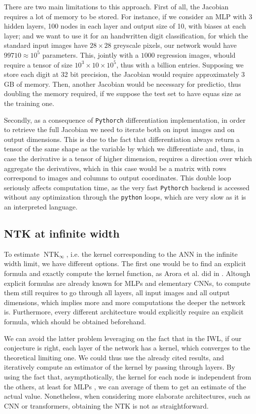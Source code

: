 \documentclass[11pt,notitlepage]{article}
\numberwithin{equation}{section}
\DeclareMathOperator{\NTK}{NTK}
\theoremstyle{remark}
\theoremstyle{definition}
\begin{document}
	There are two main limitations to this approach.
	First of all, the Jacobian requires a lot of memory to be stored.
	For instance, if we consider an MLP with 3 hidden layers, 100 nodes in each layer and output size of 10, with biases at each layer; and we want to use it for an handwritten digit classification, for which the standard input images have $28 \times 28$ greyscale pixels, our network would have $99710 \approx 10^5$ parameters.
	This, jointly with a $1000$ regression images, whould require a tensor of size $10^3 \times 10 \times 10^5$, thus with a billion entries.
	Supposing we store each digit at 32 bit precision, the Jacobian would require approximately $3$GB of memory.
	Then, another Jacobian would be necessary for predictio, thus doubling the memory required, if we suppose the test set to have equas size as the training one.
	
	Secondly, as a consequence of \verb|Pythorch| differentiation implementation, in order to retrieve the full Jacobian we need to iterate both on input images and on output dimensions.
	This is due to the fact that differentiation always return a tensor of the same shape as the variable by which we differentiate and, thus, in case the derivative is a tensor of higher dimension, requires a direction over which aggregate the derivatives, which in this case would be a matrix with rows correspond to images and columns to output coordinates.
	This double loop seriously affects computation time, as the very fast \verb|Pythorch| backend is accessed without any optimization through the \verb|python| loops, which are very slow as it is an interpreted language.
	
	\subsection{NTK at infinite width}\label{subsec:infinteImpl}
	To estimate $\NTK_\infty$, i.e. the kernel corresponding to the ANN in the infinite width limit, we have different options.
	The first one would be to find an explicit formula and exactly compute the kernel function, as Arora et al. did in \cite{arora2019exact}.
	Altough explicit formulas are already known for MLPs and elementary CNNs, to compute them still requires to go through all layers, all input images and all output dimensions, which implies more and more computations the deeper the network  is.
	Furthermore, every different architecture would explicitly require an explicit formula, which should be obtained beforehand.
	
	We can avoid the latter problem leveraging on the fact that in the IWL, if our conjecture is right, each layer of the network has a kernel, which converges to the theoretical limiting one.
	We could thus use the already cited results, and iteratively compute an estimator of the kernel by passing through layers.
	By using the fact that, asympthotically, the kernel for each node is independent from the others, at least for MLPs \cite{jacot2018neural}, we can average of them to get an estimate of the actual value.
	Nonetheless, when considering more elaborate architectures, such as CNN or transformers, obtaining the NTK is not as straightforward.
	
\end{document}

